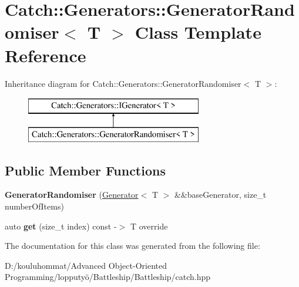 \hypertarget{class_catch_1_1_generators_1_1_generator_randomiser}{}\section{Catch\+:\+:Generators\+:\+:Generator\+Randomiser$<$ T $>$ Class Template Reference}
\label{class_catch_1_1_generators_1_1_generator_randomiser}
Inheritance diagram for Catch\+:\+:Generators\+:\+:Generator\+Randomiser$<$ T $>$\+:\begin{figure}[H]
\begin{center}
\leavevmode
\includegraphics[height=2.000000cm]{class_catch_1_1_generators_1_1_generator_randomiser}
\end{center}
\end{figure}
\subsection*{Public Member Functions}
\begin{DoxyCompactItemize}
\item 
\mbox{\label{class_catch_1_1_generators_1_1_generator_randomiser_aba3234a2885baff107766814d10c2efc}} 
{\bfseries Generator\+Randomiser} (\mbox{\hyperlink{class_catch_1_1_generators_1_1_generator}{Generator}}$<$ T $>$ \&\&base\+Generator, size\+\_\+t number\+Of\+Items)
\item 
\mbox{\label{class_catch_1_1_generators_1_1_generator_randomiser_a4ad5de15865727bdaa638863e0969ab4}} 
auto {\bfseries get} (size\+\_\+t index) const -\/$>$ T override
\end{DoxyCompactItemize}


The documentation for this class was generated from the following file\+:\begin{DoxyCompactItemize}
\item 
D\+:/kouluhommat/\+Advanced Object-\/\+Oriented Programming/lopputyö/\+Battleship/\+Battleship/catch.\+hpp\end{DoxyCompactItemize}

